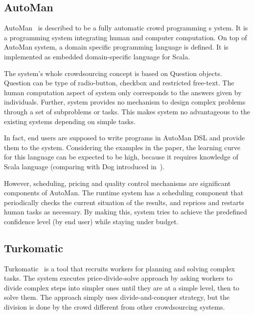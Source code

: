 
\subsection{AutoMan}
AutoMan~\cite{Barowy2012} is described to be a fully automatic crowd programming s
ystem. It is a programming system integrating human and computer computation. 
On top of AutoMan system, a domain specific programming language is defined. 
It is implemented as embedded domain-specific language for Scala.

The system's whole crowdsourcing concept is based on Question objects. 
Question can be type of radio-button, checkbox and restricted free-text. The human 
computation aspect of system only corresponds to the answers given by individuals. 
Further, system provides no mechanism to design complex problems through a 
set of subproblems or tasks. This makes system no advantageous to the 
existing systems depending on simple tasks.

In fact, end users are supposed to write programs in AutoMan DSL and provide 
them to the system. Considering the examples in the paper, the learning curve 
for this language can be expected to be high, because it requires knowledge 
of Scala language (comparing with Dog introduced in~\cite{Ahmad2011}).

However, scheduling, pricing and quality control mechanisms are significant 
components of AutoMan. The runtime system has a scheduling component that 
periodically checks the current situation of the results, and reprices and restarts 
human tasks as necessary. By making this, system tries to achieve the predefined 
confidence level (by end user) while staying under budget.


\subsection{Turkomatic}
Turkomatic~\cite{Kulkarni2012} is a tool that recruits workers for planning and 
solving complex tasks. The system executes price-divide-solve approach by 
asking workers to divide complex steps into simpler ones until they are at a simple 
level, then to solve them. The approach simply uses divide-and-conquer strategy, 
but the division is done by the crowd different from other crowdsourcing systems.

